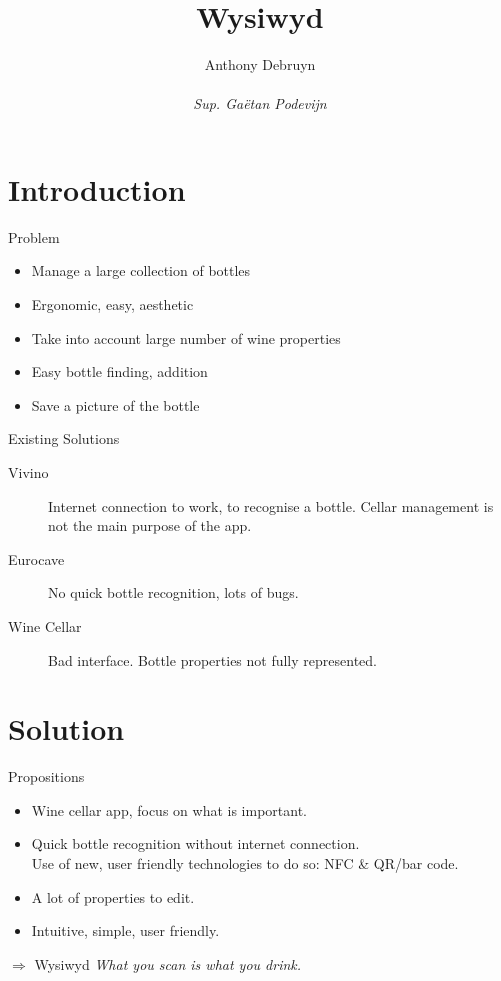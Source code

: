 \documentclass[11pt]{beamer}
\author[A.D.]{Anthony Debruyn\\~\\\small{\textit{Sup. Gaëtan Podevijn}}}
\title{Wysiwyd}
\institute[ULB]{Université Libre de Bruxelles}
\begin{document}
\begin{frame}
\titlepage
\end{frame}

\begin{frame}
\tableofcontents
\end{frame}

\section{Introduction}
\begin{frame}{Problem}

\begin{itemize}
	\item Manage a large collection of bottles
	\item Ergonomic, easy, aesthetic
	\item Take into account large number of wine properties
	\item Easy bottle finding, addition
	\item Save a picture of the bottle
\end{itemize}

\end{frame}

\begin{frame}{Existing Solutions}
\begin{description}
	\item[Vivino] Internet connection to work, to recognise a bottle. Cellar management is not the main purpose of the app.
	\item[Eurocave] No quick bottle recognition, lots of bugs.
	\item[Wine Cellar] Bad interface. Bottle properties not fully represented.
\end{description}
\end{frame}

\section{Solution}

\begin{frame}{Propositions}
\begin{itemize}
	\item Wine cellar app, focus on what is important.
	\item Quick bottle recognition without internet connection.\\
	Use of new, user friendly technologies to do so: NFC \& QR/bar code.
	\item A lot of properties to edit.
	\item Intuitive, simple, user friendly.
\end{itemize}

\center $\Rightarrow$ Wysiwyd
\center \emph{What you scan is what you drink.}
\end{frame}
\end{document}
